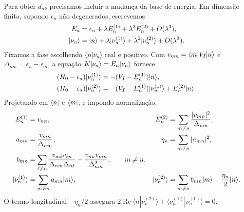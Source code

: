 Para obter $d_{nk}$ precisamos incluir a mudança da base de energia.
Em dimensão finita, supondo $\epsilon_n$ não degenerados, escrevemos
\begin{align}
 E_n&=\epsilon_n+\lambda E_n^{(1)}+\lambda^2E_n^{(2)}
       +O(\lambda^3),\nonumber\\
 \lvert \nu_n\rangle&=\lvert n\rangle+\lambda\lvert \nu_n^{(1)}\rangle
                   +\lambda^2\lvert \nu_n^{(2)}\rangle+O(\lambda^3).
 \label{eq:energyseries}
\end{align}
Fixamos a fase escolhendo $\langle n|\nu_n\rangle$ real e positivo.
Com $v_{mn}=\langle m\rvert V_I\lvert n\rangle$ e $\Delta_{nm}=\epsilon_n-\epsilon_m$,
a equação $K\lvert \nu_n\rangle=E_n\lvert \nu_n\rangle$ fornece
\begin{align}
 (H_0-\epsilon_n)\lvert \nu_n^{(1)}\rangle
   &=-(V_I-E_n^{(1)})\lvert n\rangle,\nonumber\\
 (H_0-\epsilon_n)\lvert \nu_n^{(2)}\rangle
   &=-(V_I-E_n^{(1)})\lvert \nu_n^{(1)}\rangle+E_n^{(2)}\lvert n\rangle.
 \label{eq:eigenrecurrence}
\end{align}
Projetando em $\langle n\rvert$ e $\langle m\rvert$, e impondo normalização,
\begin{align}
 E_n^{(1)}&=v_{nn},&
 E_n^{(2)}&=\sum_{m\ne n}\frac{|v_{mn}|^2}{\Delta_{nm}},
 \label{eq:Ecoeff}\\
 a_{mn}&=\frac{v_{mn}}{\Delta_{nm}},&
 \eta_n&=\sum_{m\ne n}|a_{mn}|^2,\nonumber\\
 b_{mn}&=\sum_{\ell\ne n}
 \frac{v_{m\ell}v_{\ell n}}{\Delta_{nm}\Delta_{n\ell}}
 -\frac{v_{nn}v_{mn}}{\Delta_{nm}^2},\qquad m\ne n,
 \label{eq:ab}\\
 \lvert \nu_n^{(1)}\rangle&=\sum_{m\ne n}a_{mn}\lvert m\rangle,\qquad&
 \lvert \nu_n^{(2)}\rangle&=\sum_{m\ne n}b_{mn}\lvert m\rangle-\frac{\eta_n}{2}\lvert n\rangle.
 \label{eq:energyvectors}
\end{align}
O termo longitudinal $-\eta_n/2$ assegura
$2\operatorname{Re}\langle n|\nu_n^{(2)}\rangle+
\langle\nu_n^{(1)}|\nu_n^{(1)}\rangle=0$.

